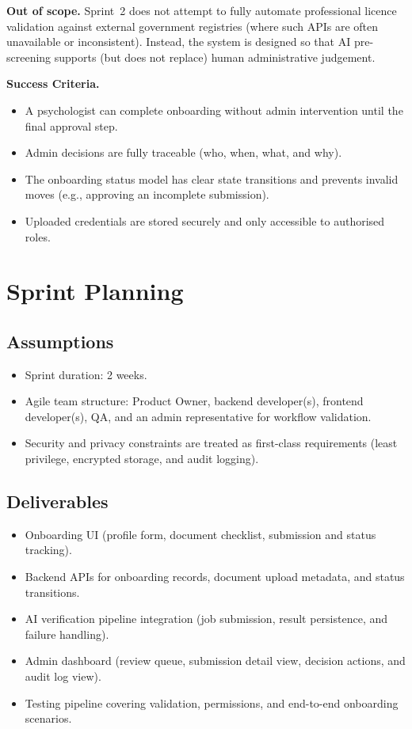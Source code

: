 \textbf{Out of scope.} Sprint~2 does not attempt to fully automate professional
licence validation against external government registries (where such APIs are
often unavailable or inconsistent). Instead, the system is designed so that AI
pre-screening supports (but does not replace) human administrative judgement.

\textbf{Success Criteria.}
\begin{itemize}
    \item A psychologist can complete onboarding without admin intervention
    until the final approval step.
    \item Admin decisions are fully traceable (who, when, what, and why).
    \item The onboarding status model has clear state transitions and prevents
    invalid moves (e.g., approving an incomplete submission).
    \item Uploaded credentials are stored securely and only accessible to
    authorised roles.
\end{itemize}

\section{Sprint Planning}
\label{sec:sprint2-planning}

\subsection{Assumptions}
\begin{itemize}
    \item Sprint duration: 2 weeks.
    \item Agile team structure: Product Owner, backend developer(s), frontend
    developer(s), QA, and an admin representative for workflow validation.
    \item Security and privacy constraints are treated as first-class
    requirements (least privilege, encrypted storage, and audit logging).
\end{itemize}

\subsection{Deliverables}
\begin{itemize}
    \item Onboarding UI (profile form, document checklist, submission and status
    tracking).
    \item Backend APIs for onboarding records, document upload metadata, and
    status transitions.
    \item AI verification pipeline integration (job submission, result
    persistence, and failure handling).
    \item Admin dashboard (review queue, submission detail view, decision
    actions, and audit log view).
    \item Testing pipeline covering validation, permissions, and end-to-end
    onboarding scenarios.
\end{itemize}

